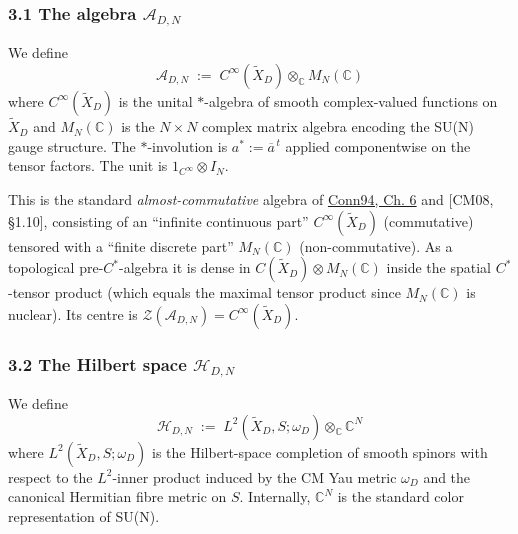 \documentclass[
  11pt,
  a4paper,
]{amsart}
\begin{document}
\hypertarget{the-algebra-mathcala_dn}{%
\subsubsection{\texorpdfstring{3.1 The algebra \(\mathcal{A}_{D,N}\)}{3.1 The algebra \textbackslash mathcal\{A\}\_\{D,N\}}}\label{the-algebra-mathcala_dn}}

We define
\begin{equation}\label{eq:algebra}
\boxed{\;\mathcal{A}_{D,N} \;:=\; C^\infty(\widetilde{X}_D) \otimes_{\mathbb{C}} M_N(\mathbb{C})\;}
\end{equation}
where \(C^\infty(\widetilde{X}_D)\) is the unital \(*\)-algebra of smooth
complex-valued functions on \(\widetilde{X}_D\) and \(M_N(\mathbb{C})\) is the
\(N\times N\) complex matrix algebra encoding the SU(N) gauge structure. The
\(*\)-involution is \(a^* := \overline{a}^{\,t}\) applied componentwise on the
tensor factors. The unit is \(1_{C^\infty} \otimes I_N\).

This is the standard \emph{almost-commutative} algebra of \href{spectral\%20triples\%20on\%20smooth\%20Riemannian\%20manifolds\%20tensored}{Conn94, Ch. 6} and
{[}CM08, §1.10{]}, consisting of an ``infinite continuous part'' \(C^\infty(\widetilde{X}_D)\)
(commutative) tensored with a ``finite discrete part'' \(M_N(\mathbb{C})\)
(non-commutative). As a topological pre-\(C^*\)-algebra it is dense in
\(C(\widetilde{X}_D) \otimes M_N(\mathbb{C})\) inside the spatial \(C^*\)-tensor
product (which equals the maximal tensor product since \(M_N(\mathbb{C})\) is
nuclear). Its centre is \(\mathcal{Z}(\mathcal{A}_{D,N}) = C^\infty(\widetilde{X}_D)\).

\hypertarget{the-hilbert-space-mathcalh_dn}{%
\subsubsection{\texorpdfstring{3.2 The Hilbert space \(\mathcal{H}_{D,N}\)}{3.2 The Hilbert space \textbackslash mathcal\{H\}\_\{D,N\}}}\label{the-hilbert-space-mathcalh_dn}}

We define
\begin{equation}\label{eq:hilbert}
\boxed{\;\mathcal{H}_{D,N} \;:=\; L^2(\widetilde{X}_D, S; \omega_D) \otimes_{\mathbb{C}} \mathbb{C}^N\;}
\end{equation}
where \(L^2(\widetilde{X}_D, S; \omega_D)\) is the Hilbert-space completion of
smooth spinors with respect to the \(L^2\)-inner product induced by the CM Yau
metric \(\omega_D\) and the canonical Hermitian fibre metric on \(S\). Internally,
\(\mathbb{C}^N\) is the standard color representation of SU(N).
\end{document}
